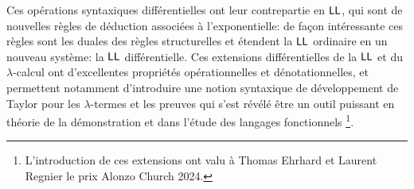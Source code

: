 \documentclass[a4]{article}
\begin{document}
Ces opérations syntaxiques différentielles ont leur contrepartie en
$\hbox{\textsf{LL}}$, qui sont de nouvelles règles de déduction associées à
l'exponentielle: de façon intéressante ces règles sont les duales des
règles structurelles et étendent la $\hbox{\textsf{LL}}$ ordinaire en un nouveau
système: la $\hbox{\textsf{LL}}$ différentielle.
%
Ces extensions différentielles de la $\hbox{\textsf{LL}}$ et du $\lambda$-calcul ont
d'excellentes propriétés opérationnelles et dénotationnelles, et
permettent notamment d'introduire une notion syntaxique de
développement de Taylor pour les $\lambda$-termes et les preuves qui
s'est révélé être un outil puissant en théorie de la démonstration et
dans l'étude des langages fonctionnels%
\footnote{L'introduction de ces extensions ont valu à Thomas Ehrhard
  et Laurent Regnier le prix Alonzo Church 2024.}.



\end{document}
